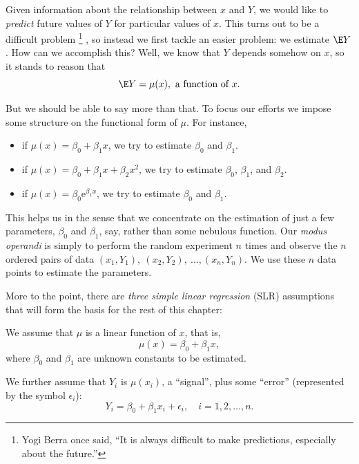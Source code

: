 \documentclass[captions=tableheading]{scrbook}
\begin{document}
Given information about the relationship between \(x\) and \(Y\), we would like to \emph{predict} future values of \(Y\) for particular values of \(x\). This turns out to be a difficult problem \!\!
\footnote{Yogi Berra once said, ``It is always difficult to make predictions, especially about the future.''}
, so instead we first tackle an easier problem: we estimate \( \E Y \). How can we accomplish this? Well, we know that \(Y\) depends somehow on \(x\), so it stands to reason that
\begin{equation}
\E Y = \mu(x),\ \mbox{a function of }x.
\end{equation}

But we should be able to say more than that. To focus our efforts we impose some structure on the functional form of \(\mu\). For instance, 
\begin{itemize}
\item if \(\mu(x)=\beta_{0}+\beta_{1}x\), we try to estimate \( \beta_{0} \) and \( \beta_{1} \).
\item if \( \mu(x) = \beta_{0} + \beta_{1}x + \beta_{2}x^{2} \), we try to estimate \(\beta_{0}\), \(\beta_{1}\), and \(\beta_{2}\).
\item if \( \mu(x) = \beta_{0} \mathrm{e}^{\beta_{1}x} \), we try to estimate \(\beta_{0}\) and \(\beta_{1}\).
\end{itemize}

This helps us in the sense that we concentrate on the estimation of just a few parameters, \(\beta_{0}\) and \(\beta_{1}\), say, rather than some nebulous function. Our \emph{modus operandi} is simply to perform the random experiment \(n\) times and observe the \(n\) ordered pairs of data \( (x_{1},Y_{1}),\ (x_{2},Y_{2}),\ \ldots,(x_{n},Y_{n}) \). We use these \(n\) data points to estimate the parameters.

More to the point, there are \emph{three simple linear regression} (SLR) assumptions that will form the basis for the rest of this chapter:

\begin{assumption}
We assume that \(\mu\) is a linear function of \(x\), that is, 
\begin{equation}
\mu(x)=\beta_{0}+\beta_{1}x,
\end{equation}
where \(\beta_{0}\) and \(\beta_{1}\) are unknown constants to be estimated.
\end{assumption}

\begin{assumption}
We further assume that \( Y_{i} \) is \( \mu(x_{i}) \), a ``signal'', plus some ``error'' (represented by the symbol \( \epsilon_{i} \)):
\begin{equation}
Y_{i} = \beta_{0} + \beta_{1}x_{i} + \epsilon_{i}, \quad i = 1,2,\ldots,n.
\end{equation}
\end{assumption}
\end{document}
